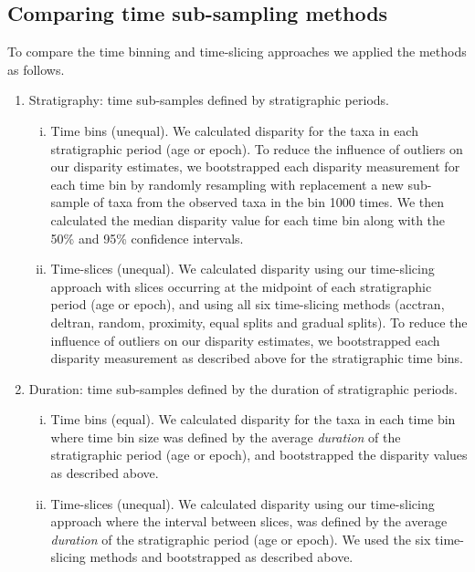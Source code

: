 \documentclass[12pt,a4paper]{article}
\begin{document}
\subsection{Comparing time sub-sampling methods}

To compare the time binning and time-slicing approaches we applied the methods as follows. 

\begin{enumerate}
  \item Stratigraphy: time sub-samples defined by stratigraphic periods. 
  \begin{enumerate}[(i)]
    \item Time bins (unequal). 
    We calculated disparity for the taxa in each stratigraphic period (age or epoch). 
    To reduce the influence of outliers on our disparity estimates, we bootstrapped each disparity measurement for each time bin by randomly resampling with replacement a new sub-sample of taxa from the observed taxa in the bin 1000 times.
    We then calculated the median disparity value for each time bin along with the 50\% and 95\% confidence intervals.
    \item Time-slices (unequal).
    We calculated disparity using our time-slicing approach with slices occurring at the midpoint of each stratigraphic period (age or epoch), and using all six time-slicing methods (acctran, deltran, random, proximity, equal splits and gradual splits).
    To reduce the influence of outliers on our disparity estimates, we bootstrapped each disparity measurement as described above for the stratigraphic time bins.
    \end{enumerate}

  \item Duration: time sub-samples defined by the duration of stratigraphic periods. 
  \begin{enumerate}[(i)]
    \item Time bins (equal). 
    We calculated disparity for the taxa in each time bin where time bin size was defined by the average \textit{duration} of the stratigraphic period (age or epoch), and bootstrapped the disparity values as described above.
    \item Time-slices (unequal).
    We calculated disparity using our time-slicing approach where the interval between slices, was defined by the average \textit{duration} of the stratigraphic period (age or epoch).
    We used the six time-slicing methods and bootstrapped as described above.
  \end{enumerate}


\end{enumerate}
\end{document}
